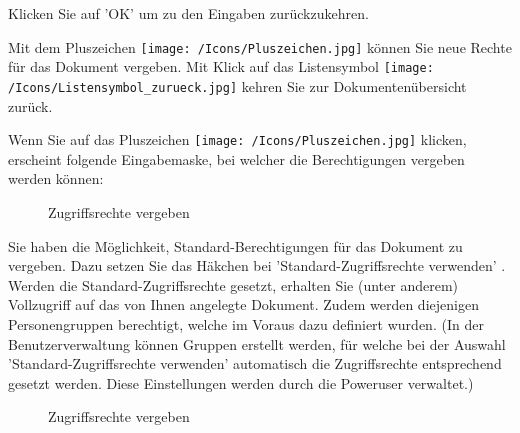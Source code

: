 Klicken Sie auf 'OK' um zu den Eingaben zurückzukehren. 

\vspace{\baselineskip}

Mit dem Pluszeichen \texttt{[image: /Icons/Pluszeichen.jpg]}  können Sie neue Rechte für das Dokument vergeben. Mit Klick auf das Listensymbol \texttt{[image: /Icons/Listensymbol\_zurueck.jpg]}  kehren Sie zur Dokumentenübersicht zurück.

\vspace{\baselineskip}

Wenn Sie auf das Pluszeichen \texttt{[image: /Icons/Pluszeichen.jpg]}  klicken, erscheint folgende Eingabemaske, bei welcher die Berechtigungen vergeben werden können:

\begin{figure}[H]
\caption{Zugriffsrechte vergeben}
\end{figure}

Sie haben die Möglichkeit, Standard-Berechtigungen für das Dokument zu vergeben. Dazu setzen Sie das Häkchen bei 'Standard-Zugriffsrechte verwenden' . Werden die Standard-Zugriffsrechte gesetzt, erhalten Sie (unter anderem) Vollzugriff auf das von Ihnen angelegte Dokument. Zudem werden diejenigen Personengruppen berechtigt, welche im Voraus dazu definiert wurden. (In der Benutzerverwaltung können Gruppen erstellt werden, für welche bei der Auswahl 'Standard-Zugriffsrechte verwenden' automatisch die Zugriffsrechte entsprechend gesetzt werden. Diese Einstellungen werden durch die Poweruser verwaltet.)

\begin{figure}[H]
\caption{Zugriffsrechte vergeben}
\end{figure}

